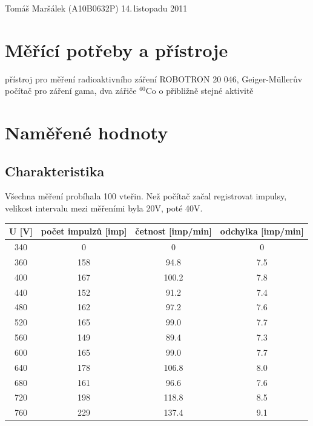 \documentclass[10pt]{article}
\begin{document}
 {Tomáš Maršálek}
 {(A10B0632P)}
 {14.\,listopadu 2011}

\section{Měřící potřeby a přístroje}
přístroj pro měření radioaktivního záření ROBOTRON 20 046, Geiger-M\"ullerův
počítač pro záření gama, dva zářiče $^{60}$Co o přibližně stejné aktivitě

\section{Naměřené hodnoty}
\subsection{Charakteristika}
Všechna měření probíhala 100 vteřin. Než počítač začal registrovat impulsy,
velikost intervalu mezi měřeními byla 20V, poté 40V. \\

\begin{center}
\begin{tabular}{|c|c|c|c|}
\hline
U [V] & počet impulzů [imp] & četnost [imp/min] & odchylka [imp/min]\\
\hline
340 & 0   & 0      & 0 \\
360 & 158 & 94.8   & 7.5  \\
400 & 167 & 100.2  & 7.8  \\
440 & 152 & 91.2   & 7.4  \\
480 & 162 & 97.2   & 7.6  \\
520 & 165 & 99.0   & 7.7  \\
560 & 149 & 89.4   & 7.3  \\
600 & 165 & 99.0   & 7.7  \\
640 & 178 & 106.8  & 8.0  \\
680 & 161 & 96.6   & 7.6  \\
720 & 198 & 118.8  & 8.5  \\
760 & 229 & 137.4  & 9.1  \\
\hline
\end{tabular}
\end{center}
\end{document}
